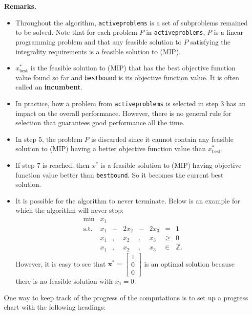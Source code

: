 \documentclass[]{book}
\renewcommand{\vec}[1]{\mathbf{#1}}
\theoremstyle{definition}
\theoremstyle{definition}
\theoremstyle{remark}
\begin{document}
\textbf{Remarks.}

\begin{itemize}
\item
  Throughout the algorithm, \texttt{activeproblems} is a set of
  subproblems remained to be solved. Note that for each problem \(P\) in
  \texttt{activeproblems}, \(P\) is a linear programming problem and
  that any feasible solution to \(P\) satisfying the integrality
  requirements is a feasible solution to (MIP).
\item
  \(x^*_{\text{best}}\) is the feasible solution to (MIP) that has the
  best objective function value found so far and \texttt{bestbound} is
  its objective function value. It is often called an
  \textbf{incumbent}.
\item
  In practice, how a problem from \texttt{activeproblems} is selected in
  step 3 has an impact on the overall performance. However, there is no
  general rule for selection that guarantees good performance all the
  time.
\item
  In step 5, the problem \(P\) is discarded since it cannot contain any
  feasible solution to (MIP) having a better objective function value
  than \(x^*_{\text{best}}\).
\item
  If step 7 is reached, then \(x^*\) is a feasible solution to (MIP)
  having objective function value better than \texttt{bestbound}. So it
  becomes the current best solution.
\item
  It is possible for the algorithm to never terminate. Below is an
  example for which the algorithm will never stop:
  \[\begin{array}{rrcrcrcl}
  \min & x_1 \\
  \text{s.t.} & x_1 & + &  2x_2&  -&  2x_3&  =&  1 \\
  & x_1& , & x_2& , & x_3 & \geq & 0 \\
  & x_1& ,&  x_2& , & x_3 & \in & \mathbb{Z}.
  \end{array}
  \] However, it is easy to see that
  \(\vec{x}^* = \begin{bmatrix} 1 \\ 0 \\ 0\end{bmatrix}\) is an optimal
  solution because there is no feasible solution with \(x_1=0\).
\end{itemize}

One way to keep track of the progress of the computations is to set up a
progress chart with the following headings:
\end{document}
